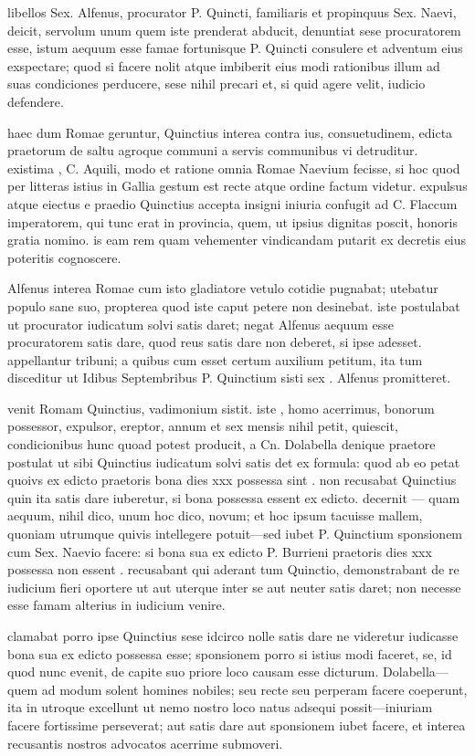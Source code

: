  libellos Sex. Alfenus, procurator P. Quincti, familiaris et propinquus Sex. Naevi, deicit, servolum unum quem iste prenderat abducit, denuntiat sese procuratorem esse, istum aequum esse famae fortunisque P. Quincti consulere et adventum eius exspectare; quod si facere nolit atque imbiberit eius modi rationibus illum ad suas condiciones perducere, sese nihil precari et, si quid agere velit, iudicio defendere.

 haec dum Romae geruntur, Quinctius interea contra ius, consuetudinem, edicta praetorum de saltu agroque communi a servis communibus vi detruditur. existima , C. Aquili, modo et ratione omnia Romae Naevium fecisse, si hoc quod per litteras istius in Gallia gestum est recte atque ordine factum videtur. expulsus atque eiectus e praedio Quinctius accepta insigni iniuria confugit ad C. Flaccum imperatorem, qui tunc erat in provincia, quem, ut ipsius dignitas poscit, honoris gratia nomino. is eam rem quam vehementer vindicandam putarit ex decretis eius poteritis cognoscere.

 Alfenus interea Romae cum isto gladiatore vetulo cotidie pugnabat; utebatur populo sane suo, propterea quod iste caput petere non desinebat. iste postulabat ut procurator iudicatum solvi satis daret; negat Alfenus aequum esse procuratorem satis dare, quod reus satis dare non deberet, si ipse adesset. appellantur tribuni; a quibus cum esset certum auxilium petitum, ita tum disceditur ut Idibus Septembribus P. Quinctium sisti sex . Alfenus promitteret.

 venit Romam Quinctius, vadimonium sistit. iste , homo acerrimus, bonorum possessor, expulsor, ereptor, annum et sex mensis nihil petit, quiescit, condicionibus hunc quoad potest producit, a Cn. Dolabella denique praetore postulat ut sibi Quinctius iudicatum solvi satis det ex formula: quod ab eo petat quoivs ex edicto praetoris bona dies xxx possessa sint . non recusabat Quinctius quin ita satis dare iuberetur, si bona possessa essent ex edicto. decernit — quam aequum, nihil dico, unum hoc dico, novum; et hoc ipsum tacuisse mallem, quoniam utrumque quivis intellegere potuit—sed iubet P. Quinctium sponsionem cum Sex. Naevio facere: si bona sua ex edicto P. Burrieni praetoris dies xxx possessa non essent . recusabant qui aderant tum Quinctio, demonstrabant de re iudicium fieri oportere ut aut uterque inter se aut neuter satis daret; non necesse esse famam alterius in iudicium venire.

 clamabat porro ipse Quinctius sese idcirco nolle satis dare ne videretur iudicasse bona sua ex edicto possessa esse; sponsionem porro si istius modi faceret, se, id quod nunc evenit, de capite suo priore loco causam esse dicturum. Dolabella—quem ad modum solent homines nobiles; seu recte seu perperam facere coeperunt, ita in utroque excellunt ut nemo nostro loco natus adsequi possit—iniuriam facere fortissime perseverat; aut satis dare aut sponsionem iubet facere, et interea recusantis nostros advocatos acerrime submoveri.

